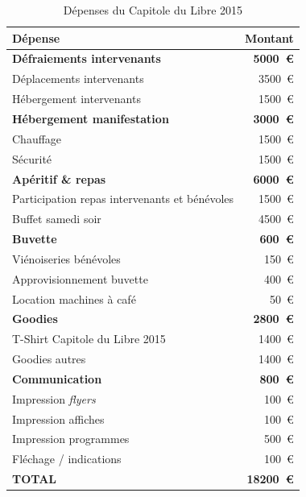 \begin{table}
\begin{center}
	\caption{Dépenses du Capitole du Libre 2015}\label{tab_dépenses}
    \begin{tabular}{|l|r|}
        \hline \textbf{Dépense} & \textbf{Montant} \\
        \hline \textbf{Défraiements intervenants} & \textbf{\SI{5000}{€}} \\
        \hline Déplacements intervenants & \SI{3500}{€} \\
        \hline Hébergement intervenants & \SI{1500}{€} \\
        \hline \textbf{Hébergement manifestation} & \textbf{\SI{3000}{€}}\\
        \hline Chauffage & \SI{1500}{€} \\
        \hline Sécurité & \SI{1500}{€} \\
        \hline \textbf{Apéritif \& repas} & \textbf{\SI{6000}{€}}\\
        \hline Participation repas intervenants et bénévoles & \SI{1500}{€} \\
        \hline Buffet samedi soir & \SI{4500}{€} \\
        \hline \textbf{Buvette} & \textbf{\SI{600}{€}}\\
        \hline Viénoiseries bénévoles & \SI{150}{€} \\
        \hline Approvisionnement buvette & \SI{400}{€} \\
        \hline Location machines à café & \SI{50}{€} \\
        \hline \textbf{Goodies} & \textbf{\SI{2800}{€} }\\
        \hline T-Shirt Capitole du Libre 2015 & \SI{1400}{€} \\
        \hline Goodies autres & \SI{1400}{€} \\
        \hline \textbf{Communication} & \textbf{\SI{800}{€}} \\
        \hline Impression \textit{flyers} & \SI{100}{€} \\
        \hline Impression affiches & \SI{100}{€} \\
        \hline Impression programmes & \SI{500}{€} \\
        \hline Fléchage / indications & \SI{100}{€} \\
        \hline
        \hline \textbf{TOTAL} & \textbf{\SI{18200}{€}} \\
        \hline
    \end{tabular}
\end{center}
\end{table}

